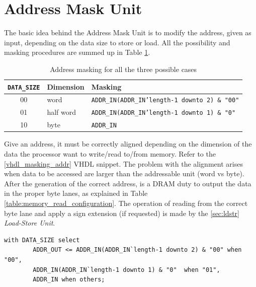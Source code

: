 \section{Address Mask Unit}
The basic idea behind the Address Mask Unit is to modify the address, given as input, depending on the data size to store or load. All the possibility and masking procedures are summed up in Table \ref{tab:addr_masking}. 

\begin{table}[ht]
    \begin{center}
        \begin{tabular}{ c| l | l}
            \texttt{DATA\_SIZE} & \textbf{Dimension} & \textbf{Masking}\\
            \hline
            00 & word & \texttt{ADDR\_IN(ADDR\_IN'length-1 downto 2) \& "00"}\\
            01 & half word & \texttt{ADDR\_IN(ADDR\_IN'length-1 downto 1) \& "0"} \\
            10 & byte & \texttt{ADDR\_IN}
            
        \end{tabular}
        \caption{Address masking for all the three possible cases}
        \label{tab:addr_masking}
    \end{center}
\end{table}


Give an address, it must be correctly aligned depending on the dimension of the data the processor want to write/read to/from memory. Refer to the \ref{vhdl_masking_addr} VHDL snippet. The problem with the alignment arises when data to be accessed are larger than the addressable unit (word vs byte). \\

After the generation of the correct address, is a DRAM duty to output the data in the proper byte lanes, as explained in Table \ref{table:memory_read_configuration}. The operation of reading from the correct byte lane and apply a sign extension (if requested) is made by the \ref{sec:ldstr} \emph{Load-Store Unit}.



\hfill
\begin{lstlisting}[style=vhdl,caption={VHDL code for address alignment},label=vhdl_masking_addr]
    with DATA_SIZE select
        ADDR_OUT <= ADDR_IN(ADDR_IN`length-1 downto 2) & "00" when "00",
        ADDR_IN(ADDR_IN`length-1 downto 1) & "0"  when "01",
        ADDR_IN when others;
\end{lstlisting}

